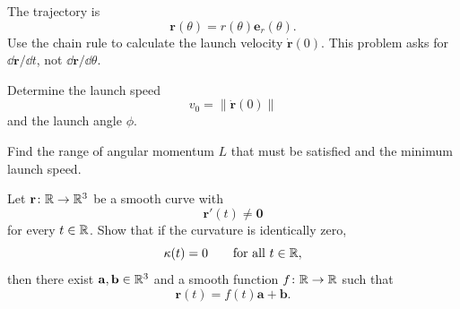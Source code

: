 \begin{problem}
\begin{problemsubparts}
\item The trajectory is
\[
\mathbf r(\theta)=r(\theta)\mathbf e_r(\theta).
\]
Use the chain rule to calculate the launch velocity $\dot{\mathbf r}(0)$. This problem asks for $\dd\mathbf r/\dd t$, not $\dd\mathbf r/\dd\theta$.
\item Determine the launch speed
\[
v_0=\|\dot{\mathbf r}(0)\|
\]
and the launch angle $\phi$.
\item Find the range of angular momentum $L$ that must be satisfied and the minimum launch speed.
\end{problemsubparts}
\end{problem}

\begin{problem}
Let $\mathbf r\colon\mathbb{R}\to\mathbb{R}^3$ be a smooth curve with
\[
\mathbf r'(t)\ne\mathbf0
\]
for every $t\in\mathbb{R}$. Show that if the curvature is identically zero,
\[
\kappa(t)=0
\qquad\text{for all }t\in\mathbb{R},
\]
then there exist $\mathbf a, \mathbf b\in\mathbb{R}^3$ and a smooth function $f\colon\mathbb{R}\to\mathbb{R}$ such that
\[
\mathbf r(t)=f(t)\mathbf a+\mathbf b.
\]
\end{problem}
